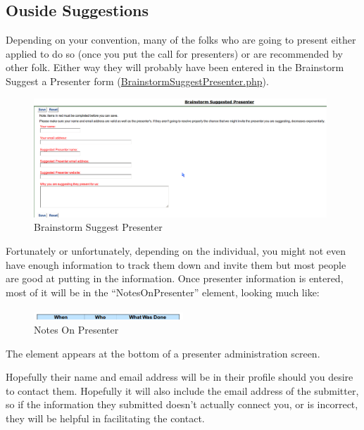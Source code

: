 \documentclass[tablesignature]{scrartcl}
\begin{document}
\subsection{Ouside Suggestions}
\label{sec-2_1}

   
   Depending on your convention, many of the folks who are going to
   present either applied to do so (once you put the call for
   presenters) or are recommended by other folk.  Either way they
   will probably have been entered in the Brainstorm Suggest a
   Presenter form (\hyperref[BrainstormSuggestPresenter.php]{BrainstormSuggestPresenter.php}).

\begin{figure}[H]
\centering
\includegraphics[width=0.98\textwidth]{./Images/Brainstorm_Suggest_Presenter.png}
\caption{\label{fig:Zambia_Presenter_Flow_Brainstorm_Suggest_Presenter}Brainstorm Suggest Presenter}
\end{figure}

   Fortunately or unfortunately, depending on the individual, you
   might not even have enough information to track them down and
   invite them but most people are good at putting in the
   information.  Once presenter information is entered, most of it
   will be in the ``NotesOnPresenter'' element, looking much like:

\begin{figure}[H]
\centering
\includegraphics[width=0.5\textwidth]{./Images/Notes_On_Participant.png}
\caption{\label{fig:Zambia_Presenter_Flow_Notes_On_Presenter}Notes On Presenter}
\end{figure}

   The element appears at the bottom of a presenter administration
   screen.

   Hopefully their name and email address will be in their profile
   should you desire to contact them.  Hopefully it will also include
   the email address of the submitter, so if the information they
   submitted doesn't actually connect you, or is incorrect, they will
   be helpful in facilitating the contact.
\end{document}
